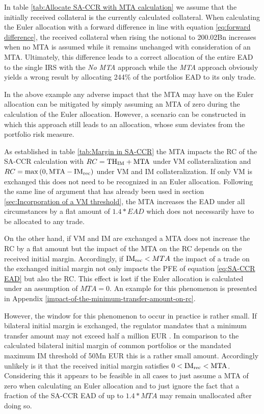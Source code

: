 \documentclass[../Thesis_AHoecherl.tex]{subfiles}
\begin{document}
    In table \ref{tab:Allocate SA-CCR with MTA calculation} we assume that the initially received collateral is the currently calculated collateral. 
    When calculating the Euler allocation with a forward difference in line with equation \ref{eq:forward difference}, the received collateral when rising the notional to 200.02Bn increases when no \gls{MTA} is assumed while it remains unchanged with consideration of an MTA. 
    Ultimately, this difference leads to a correct allocation of the entire \gls{EAD} to the single \gls{IRS} with the \emph{No MTA} approach while the \emph{MTA} approach obviously yields a wrong result by allocating 244\% of the portfolios \gls{EAD} to its only trade.

    In the above example any adverse impact that the \gls{MTA} may have on the Euler allocation can be mitigated by simply assuming an \gls{MTA} of zero during the calculation of the Euler allocation.
    However, a scenario can be constructed in which this approach still leads to an allocation, whose sum deviates from the portfolio risk measure.

    As established in table \ref{tab:Margin in SA-CCR} the \gls{MTA} impacts the RC of the \gls{SA-CCR} calculation with $RC = \text{TH\textsubscript{IM}} + \text{MTA}$ under \gls{VM} collateralization and $RC = \max{\left(0, \text{MTA} - \text{IM\textsubscript{rec}}\right)}$ under \gls{VM} and \gls{IM} collateralization.
    If only \gls{VM} is exchanged this does not need to be recognized in an Euler allocation. Following the same line of argument that has already been used in section \ref{sec:Incorporation of a VM threshold}, the \gls{MTA} increases the \gls{EAD} under all circumstances by a flat amount of $1.4*EAD$ which does not necessarily have to be allocated to any trade.

    On the other hand, if \gls{VM} and \gls{IM} are exchanged a \gls{MTA} does not increase the RC by a flat amount but the impact of the \gls{MTA} on the RC depends on the received initial margin. Accordingly, if $\text{IM\textsubscript{rec}} < MTA$ the impact of a trade on the exchanged initial margin not only impacts the PFE of equation \ref{eq:SA-CCR EAD} but also the RC. This effect is lost if the Euler allocation is calculated under an assumption of $MTA = 0$. An example for this phenomenon is presented in Appendix \ref{impact-of-the-minimum-transfer-amount-on-rc}.

    However, the window for this phenomenon to occur in practice is rather small. If bilateral initial margin is exchanged, the regulator mandates that a minimum transfer amount may not exceed half a million EUR \cite[Requirement 2.3]{BCBS_MarginRequirements}.
    In comparison to the calculated bilateral initial margin of common portfolios or the mandated maximum \gls{IM} threshold of 50Mn EUR \cite[Requirement 2.2]{BCBS_MarginRequirements} this is a rather small amount.
    Accordingly unlikely is it that the received initial margin satisfies $0<\text{IM\textsubscript{rec}}<\text{MTA}$.
    Considering this it appears to be feasible in all cases to just assume a \gls{MTA} of zero when calculating an Euler allocation and to just ignore the fact that a fraction of the \gls{SA-CCR} \gls{EAD} of up to $1.4*MTA$ may remain unallocated after doing so.
\end{document}
